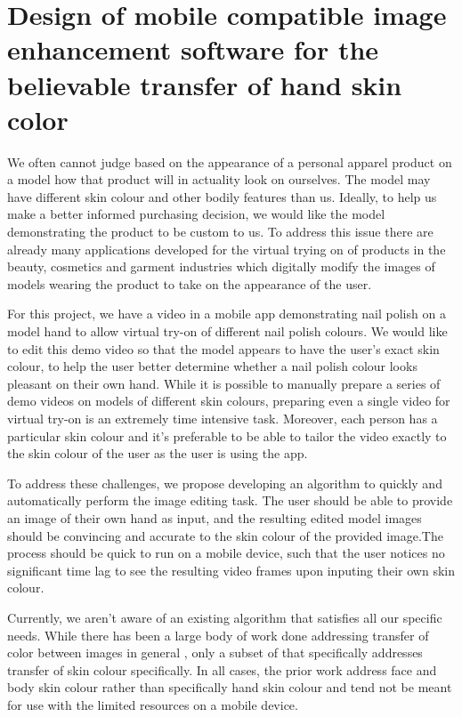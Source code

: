 \documentclass[12pt, a4paper]{article}
\begin{document}
\section*{Design of mobile compatible image enhancement software for the believable transfer of hand skin color}

We often cannot judge based on the appearance of a personal apparel product on a model how that product will in actuality look on ourselves. The model may have different skin colour and other bodily features than us. Ideally, to help us make a better informed purchasing decision, we would like the model demonstrating the product to be custom to us. To address this issue there are already many applications developed for the virtual trying on of products in the beauty, cosmetics and garment industries which digitally modify the images of models wearing the product to take on the appearance of the user. \cite{shilkrot_2013_garment}

For this project, we have a video in a mobile app demonstrating nail polish on a model hand to allow virtual try-on of different nail polish colours. We would like to edit this demo video so that the model appears to have the user's exact skin colour, to help the user better determine whether a nail polish colour looks pleasant on their own hand. While it is possible to manually prepare a series of demo videos on models of different skin colours, preparing even a single video for virtual try-on is an extremely time intensive task. Moreover, each person has a particular skin colour and it's preferable to be able to tailor the video exactly to the skin colour of the user as the user is using the app.

To address these challenges, we propose developing an algorithm to quickly and automatically perform the image editing task. The user should be able to provide an image of their own hand as input, and the resulting edited model images should be convincing and accurate to the skin colour of the provided image.The process should be quick to run on a mobile device, such that the user notices no significant time lag to see the resulting video frames upon inputing their own skin colour. 

Currently, we aren't aware of an existing algorithm that satisfies all our specific needs. While there has been a large body of work done addressing transfer of color between images in general \cite{reinhard_2001_transfer, pitie_2005_pdf,chang_2015_palette}, only a subset of that specifically addresses transfer of skin colour specifically. In all cases, the prior work address face and body skin colour rather than specifically hand skin colour and tend not be meant for use with the limited resources on a mobile device. 
\end{document}

